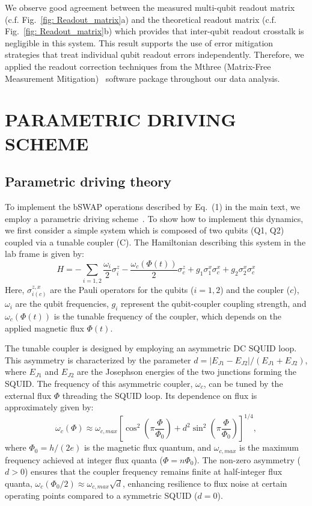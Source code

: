 \documentclass[aps,prl,epsfigure,twocolumn,superscriptaddress]{revtex4-2}
\newcommand{\1}{\mathbbm{1}}
\newcommand{\SubFig}[2]{\ref{#1}{\color{blue}#2}}
\begin{document}
We observe good agreement between the measured multi-qubit readout matrix (c.f. Fig.~\SubFig{fig: Readout_matrix}{a}) and the theoretical readout matrix (c.f. Fig.~\SubFig{fig: Readout_matrix}{b}) which provides that inter-qubit readout crosstalk is negligible in this system. This result supports the use  of error mitigation strategies that treat individual qubit readout errors independently. Therefore, we applied the readout correction techniques from the Mthree (Matrix-Free Measurement Mitigation)~\cite{Nation:21} software package throughout our data analysis.






\section{PARAMETRIC DRIVING SCHEME}

\subsection{Parametric driving theory}

To implement the bSWAP operations described by Eq.~(1) in the main text, we employ a parametric driving scheme~\cite{Marco:17}. To show how to implement this dynamics, we first consider a simple system which is composed of two qubits (Q1, Q2) coupled via a tunable coupler (C). The Hamiltonian describing this system in the lab frame is given by:
\begin{equation}
	H = -\sum_{i=1,2} \frac{\omega_i}{2}\sigma_i^z - \frac{\omega_c(\Phi(t))}{2}\sigma_c^z + g_1 \sigma_1^x \sigma_c^x + g_2 \sigma_2^x \sigma_c^x
\end{equation}
Here, $\sigma_{i(c)}^{z,x}$ are the Pauli operators for the qubits ($i=1,2$) and the coupler ($c$), $\omega_i$ are the qubit frequencies, $g_i$ represent the qubit-coupler coupling strength, and $\omega_c(\Phi(t))$ is the tunable frequency of the coupler, which depends on the applied magnetic flux $\Phi(t)$.

The tunable coupler is designed by employing an asymmetric DC SQUID loop. This asymmetry is characterized by the parameter $d = |E_{J1}-E_{J2}|/(E_{J1}+E_{J2})$, where $E_{J1}$ and $E_{J2}$ are the Josephson energies of the two junctions forming the SQUID. The frequency of this asymmetric coupler, $\omega_c$, can be tuned by the external flux $\Phi$ threading the SQUID loop. Its dependence on flux is approximately given by:
\begin{equation}
	\omega_c(\Phi) \approx \omega_{c,max} \left[ \cos^2\left(\pi \frac{\Phi}{\Phi_0}\right) + d^2 \sin^2\left(\pi \frac{\Phi}{\Phi_0}\right) \right]^{1/4} ,
	\label{SM-Eq:omega}
\end{equation}
where $\Phi_0 = h/(2e)$ is the magnetic flux quantum, and $\omega_{c,max}$ is the maximum frequency achieved at integer flux quanta ($\Phi = n\Phi_0$). The non-zero asymmetry ($d>0$) ensures that the coupler frequency remains finite at half-integer flux quanta, $\omega_c(\Phi_0/2) \approx \omega_{c,max} \sqrt{d}$, enhancing resilience to flux noise at certain operating points compared to a symmetric SQUID ($d=0$).
\end{document}
